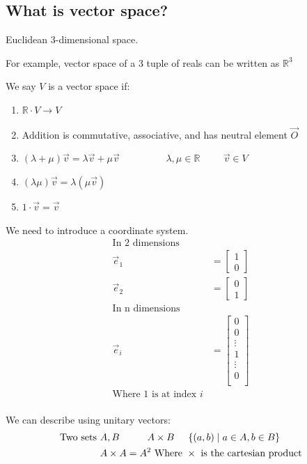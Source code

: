 \documentclass[a4paper,12pt]{article}
\begin{document}
\subsection*{What is vector space?}
\begin{list1}
	\item Euclidean 3-dimensional space. 
	\item For example, vector space of a 3 tuple of reals can be written as $\mathbb{R}^3$
	\item 
We say $V$ is a vector space if:
\begin{enumerate}
	\item $\mathbb{R} \cdot V \rightarrow V$
	\item Addition is commutative, associative, and has neutral element $\vec{O}$
	\item $(\lambda + \mu) \vec{v} = \lambda \vec{v} + \mu \vec{v} \hspace{2cm} \lambda, \mu \in \mathbb{R} \hspace{1cm} \vec{v} \in V$
	\item $(\lambda \mu)\vec{v} = \lambda(\mu \vec{v})$
	\item $1 \cdot \vec{v} = \vec{v}$
\end{enumerate}
\item We need to introduce a coordinate system.
\begin{align*}
\text{In 2 dimensions} \\
\vec{e}_1 & = \begin{bmatrix} 1 \\ 0 \end{bmatrix} \\
\vec{e}_2 & = \begin{bmatrix} 0 \\ 1 \end{bmatrix} \\
\text{In n dimensions} \\
\vec{e}_i & = \begin{bmatrix} 0 \\ 0 \\ \vdots \\ 1 \\ \vdots \\ 0 \\  \end{bmatrix} \\
\text{Where 1 is at index } i \\
\end{align*}
\item We can describe using unitary vectors:
\begin{align*}
\text{Two sets } & A, B \hspace{1cm} A \times B \hspace{0.5cm} \{(a,b)\;|\;a \in A, b \in B \} \\
& A \times A = A^2 \text{ Where } \times \text{ is the cartesian product}
\end{align*}
\end{list1}
\end{document}
